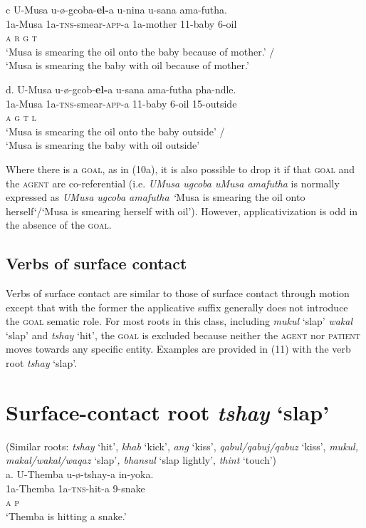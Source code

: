 \gll   c  U-Musa    u-ø-gcoba-\textbf{el-}a        u-nina    u-sana      ama-futha. \\
         1a-Musa     1a-\textsc{tns}{}-smear-\textsc{app}{}-a  1a-mother  11-baby   6-oil\\
         \textsc{a                  r        g      t}\\
\glt     ‘Musa is smearing the oil onto the baby because of mother.’ /\\
    ‘Musa is smearing the baby with oil because of mother.’
\z

\gll   d.  U-Musa     u-ø-gcob-\textbf{el-}a              u-sana    ama-futha  pha-ndle. \\
         1a-Musa   1a-\textsc{tns}{}-smear-\textsc{app}{}-a     11-baby  6-oil    15-outside\\
         \textsc{a                  g      t      l}\\
\glt ‘Musa is smearing the oil onto the baby outside’ / \\
‘Musa is smearing the baby with oil outside’ 
\z

Where there is a \textsc{goal,} as in (10a), it is also possible to drop it if that \textsc{goal} and the \textsc{agent} are co-referential (i.e. \textit{UMusa ugcoba uMusa amafutha} is normally expressed as \textit{UMusa ugcoba amafutha ‘}Musa is smearing the oil onto herself‘/‘Musa is smearing herself with oil’). However, applicativization is odd in the absence of the \textsc{goal.}

\section{Verbs of surface contact}

Verbs of surface contact are similar to those of surface contact through motion except that with the former the applicative suffix generally does not introduce the \textsc{goal} sematic role. For most roots in this class, including\textit{ mukul} ‘slap’ \textit{wakal} ‘slap’ and \textit{tshay} ‘hit’, the \textsc{goal} is excluded because neither the \textsc{agent} nor \textsc{patient} moves towards any specific entity. Examples are provided in (11) with the verb root \textit{tshay} ‘slap’.

\chapter[Surface{}-contact root  tshay ‘slap’  ]{Surface-contact root \textit{ tshay }‘slap’  }
     (Similar roots: \textit{tshay} ‘hit’, \textit{khab} ‘kick’, \textit{ang} ‘kiss’, \textit{qabul/qabuj/qabuz} ‘kiss’, \textit{mukul, makal/wakal/waqaz }‘slap’\textit{, bhansul} ‘slap lightly’, \textit{thint} ‘touch’)\\
\gll   a.  U-Themba    u-ø-tshay-a  in-yoka. \\
         1a-Themba  1a-\textsc{tns}{}-hit-a  9-snake\\
          \textsc{a                  p}\\
\glt     ‘Themba is hitting a snake.’
\z

